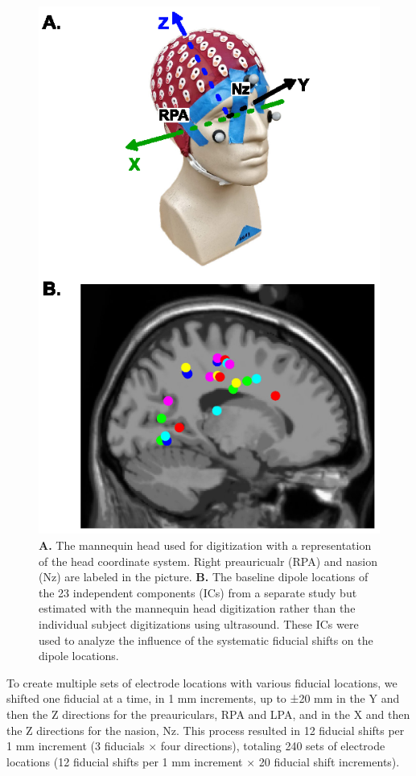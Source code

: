 \documentclass[../thesis_seyed.tex]{subfiles}
\begin{document}
\begin{figure}[bt]
      \centering
      \includegraphics[scale=1.0]{../img/fig0.eps}
      \caption{\textbf{A.} The mannequin head used for digitization with a representation of the head coordinate system. Right preauricualr (RPA) and nasion (Nz) are labeled in the picture. \textbf{B.} The baseline dipole locations of the 23 independent components (ICs) from a separate study but estimated with the mannequin head digitization rather than the individual subject digitizations using ultrasound. These ICs were used to analyze the influence of the systematic fiducial shifts on the dipole locations.}
      \label{fig:coor}
\end{figure}

To create multiple sets of electrode locations with various fiducial locations, we shifted one fiducial at a time, in 1 mm increments, up to ±20 mm in the Y and then the Z directions for the preauriculars, RPA and LPA, and in the X and then the Z directions for the nasion, Nz. This process resulted in 12 fiducial shifts per 1 mm increment (3 fiducials $\times$ four directions), totaling 240 sets of electrode locations (12 fiducial shifts per 1 mm increment $\times$ 20 fiducial shift increments).
\end{document}
